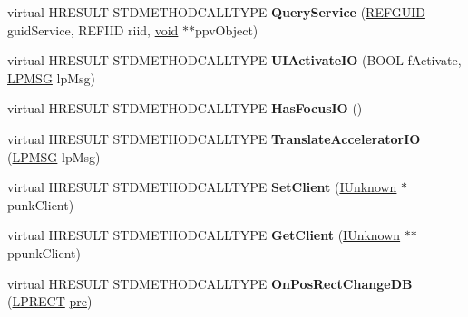 \begin{DoxyCompactItemize}
\item 
\mbox{\label{class_c_base_bar_a43acd45bf30ce960a0bfddbf9c1a2c75}} 
virtual H\+R\+E\+S\+U\+LT S\+T\+D\+M\+E\+T\+H\+O\+D\+C\+A\+L\+L\+T\+Y\+PE {\bfseries Query\+Service} (\hyperlink{struct___g_u_i_d}{R\+E\+F\+G\+U\+ID} guid\+Service, R\+E\+F\+I\+ID riid, \hyperlink{interfacevoid}{void} $\ast$$\ast$ppv\+Object)
\item 
\mbox{\label{class_c_base_bar_a670bab2bdc9e6ab76039b67384cba01d}} 
virtual H\+R\+E\+S\+U\+LT S\+T\+D\+M\+E\+T\+H\+O\+D\+C\+A\+L\+L\+T\+Y\+PE {\bfseries U\+I\+Activate\+IO} (B\+O\+OL f\+Activate, \hyperlink{structtag_m_s_g}{L\+P\+M\+SG} lp\+Msg)
\item 
\mbox{\label{class_c_base_bar_a5a995b7f93d1835c69a73aeff9b02eac}} 
virtual H\+R\+E\+S\+U\+LT S\+T\+D\+M\+E\+T\+H\+O\+D\+C\+A\+L\+L\+T\+Y\+PE {\bfseries Has\+Focus\+IO} ()
\item 
\mbox{\label{class_c_base_bar_a43606e2948d815f2498bd3fd97cd849a}} 
virtual H\+R\+E\+S\+U\+LT S\+T\+D\+M\+E\+T\+H\+O\+D\+C\+A\+L\+L\+T\+Y\+PE {\bfseries Translate\+Accelerator\+IO} (\hyperlink{structtag_m_s_g}{L\+P\+M\+SG} lp\+Msg)
\item 
\mbox{\label{class_c_base_bar_a8de67db0faaf0a4ac1860bbd367b1385}} 
virtual H\+R\+E\+S\+U\+LT S\+T\+D\+M\+E\+T\+H\+O\+D\+C\+A\+L\+L\+T\+Y\+PE {\bfseries Set\+Client} (\hyperlink{interface_i_unknown}{I\+Unknown} $\ast$punk\+Client)
\item 
\mbox{\label{class_c_base_bar_a8dab7991d3f4f8941b205788aac99b56}} 
virtual H\+R\+E\+S\+U\+LT S\+T\+D\+M\+E\+T\+H\+O\+D\+C\+A\+L\+L\+T\+Y\+PE {\bfseries Get\+Client} (\hyperlink{interface_i_unknown}{I\+Unknown} $\ast$$\ast$ppunk\+Client)
\item 
\mbox{\label{class_c_base_bar_acc4af105207e85b58472baee3b4c1a70}} 
virtual H\+R\+E\+S\+U\+LT S\+T\+D\+M\+E\+T\+H\+O\+D\+C\+A\+L\+L\+T\+Y\+PE {\bfseries On\+Pos\+Rect\+Change\+DB} (\hyperlink{structtag_r_e_c_t}{L\+P\+R\+E\+CT} \hyperlink{structtag_r_e_c_t}{prc})
\item 
\mbox{\label{class_c_base_bar_a2b5d7ca65e898c622835b12a9c6860fc}} 

\end{DoxyCompactItemize}
